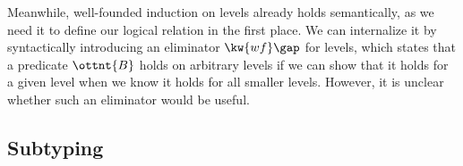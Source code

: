 \documentclass[a4paper,UKenglish,cleveref,autoref,thm-restate]{lipics-v2021}
\newcommand{\citep}[1]{\cite{#1}}
\begin{document}
Meanwhile, well-founded induction on levels already holds semantically,
as we need it to define our logical relation in the first place.
We can internalize it by syntactically introducing an eliminator $ \kw{wf} \gap   \relax  $ for levels,
which states that a predicate $\ottnt{B}$ holds on arbitrary levels
if we can show that it holds for a given level
when we know it holds for all smaller levels.
However, it is unclear whether such an eliminator would be useful.
%

\iffalse
For universes, the simplest form of an eliminator is a typecase operator,
matching on a type as a function type, the empty type, a universe, or a level type.
Such an operator is justified by \nameref{lem:canon:univ}.
However, it is known to introduce inconsistencies in the presence of parametrized inductive types.
In Idris~\citep{idris}, which has both typecase and inductives,
matching on an inductive with a parameter of type $\kw{Type} \to \kw{Type}$
yields a nonterminating expression%
\footnote{See issue \href{https://github.com/idris-lang/Idris2/issues/1116}{\#1116}},
and matching on an inductive with a parameter of type $\kw{Type} \to \kw{Bool}$
yields a proof of $\kw{Void}$%
\footnote{See issue \href{https://github.com/idris-lang/Idris2/issues/1326}{\#1326}}.
\fi

\subsection{Subtyping} \label{sec:subtyping}
\end{document}
